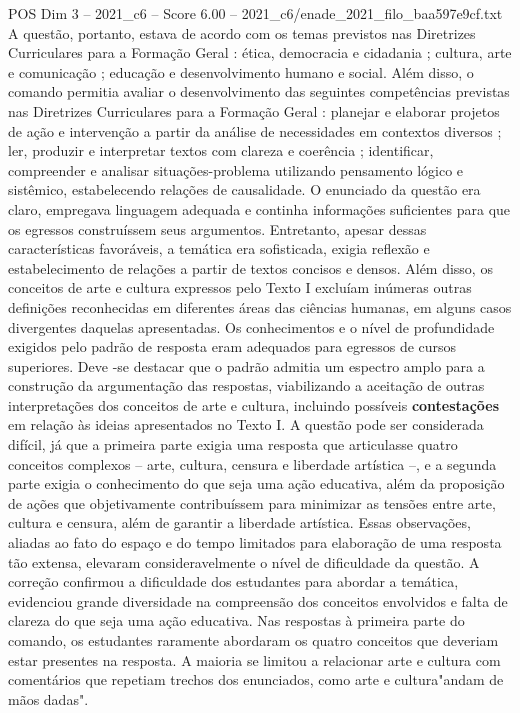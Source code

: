 \begin{textsample}{POS Dim 3 – 2021\_c6 – Score 6.00 – 2021\_c6/enade\_2021\_filo\_baa597e9cf.txt}
A questão, portanto, estava de acordo com os temas previstos nas Diretrizes Curriculares para a Formação Geral : ética, democracia e cidadania ; cultura, arte e comunicação ; educação e desenvolvimento humano e social.
Além disso, o comando permitia avaliar o desenvolvimento das seguintes competências previstas nas Diretrizes Curriculares para a Formação Geral : planejar e elaborar projetos de ação e intervenção a partir da análise de necessidades em contextos diversos ; ler, produzir e interpretar textos com clareza e coerência ; identificar, compreender e analisar situações-problema utilizando pensamento lógico e sistêmico, estabelecendo relações de causalidade.
O enunciado da questão era claro, empregava linguagem adequada e continha informações suficientes para que os egressos construíssem seus argumentos.
Entretanto, apesar dessas características favoráveis, a temática era sofisticada, exigia reflexão e estabelecimento de relações a partir de textos concisos e densos.
Além disso, os conceitos de arte e cultura expressos pelo Texto I excluíam inúmeras outras definições reconhecidas em diferentes áreas das ciências humanas, em alguns casos divergentes daquelas apresentadas.
Os conhecimentos e o nível de profundidade exigidos pelo padrão de resposta eram adequados para egressos de cursos superiores.
Deve -se destacar que o padrão admitia um espectro amplo para a construção da argumentação das respostas, viabilizando a aceitação de outras interpretações dos conceitos de arte e cultura, incluindo possíveis \textbf{contestações} em relação às ideias apresentados no Texto I.
A questão pode ser considerada difícil, já que a primeira parte exigia uma resposta que articulasse quatro conceitos complexos – arte, cultura, censura e liberdade artística –, e a segunda parte exigia o conhecimento do que seja uma ação educativa, além da proposição de ações que objetivamente contribuíssem para minimizar as tensões entre arte, cultura e censura, além de garantir a liberdade artística.
Essas observações, aliadas ao fato do espaço e do tempo limitados para elaboração de uma resposta tão extensa, elevaram consideravelmente o nível de dificuldade da questão.
A correção confirmou a dificuldade dos estudantes para abordar a temática, evidenciou grande diversidade na compreensão dos conceitos envolvidos e falta de clareza do que seja uma ação educativa.
Nas respostas à primeira parte do comando, os estudantes raramente abordaram os quatro conceitos que deveriam estar presentes na resposta.
A maioria se limitou a relacionar arte e cultura com comentários que repetiam trechos dos enunciados, como arte e cultura"andam de mãos dadas".

\end{textsample}
